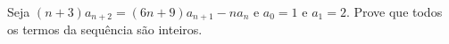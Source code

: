 Seja \((n+3)a_{n+2}=(6n+9)a_{n+1}-na_n\) e \(a_0=1\) e \(a_1=2\). Prove que todos os termos da sequência são inteiros.
